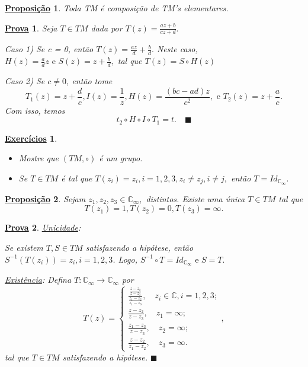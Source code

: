 \documentclass{article}
\newtheorem*{proof*}{\underline{Prova}}
\newtheorem*{prop*}{\underline{Proposi\c c\~ao}}
\newtheorem*{exer*}{\underline{Exerc\'icios}}
\renewcommand\qedsymbol{$\blacksquare$}
\begin{document}
 \begin{prop*}
   Toda TM \'e composi\c c\~ao de TM's elementares.
 \end{prop*}
 \begin{proof*}
   Seja $T\in{TM}$ dada por $T(z) = \frac{az + b}{cz + d}.$

   Caso 1) Se c = 0, ent\~ao $T(z) = \frac{az}{d} + \frac{b}{d}.$ Neste caso, $H(z) = \frac{a}{d}z \text{ e } S(z) = z + \frac{b}{d},$
   tal que $T(z) = S\circ{H(z)}$

  Caso 2) Se $c\neq0$, ent\~ao tome 
  $$
   T_1(z) = z + \frac{d}{c}, I(z) = \frac{1}{z}, H(z) = \frac{(bc - ad)z}{c^2}, \text{ e } T_2(z) = z + \frac{a}{c}.
  $$
Com isso, temos 
  $$
  t_2\circ{H}\circ{I}\circ{T_1} = t. \quad \text{\qedsymbol}
  $$
 \end{proof*}
\begin{exer*}
 \begin{itemize}
   \item[1)]Mostre que $(TM, \circ)$ \'e um grupo.
   \item[2)] Se $T\in{TM}$ \'e tal que $T(z_{i}) = z_{i}, i = 1, 2, 3, z_{i}\neq z_{j}, i\neq{j},$ ent\~ao $T = Id_{\mathbb{C}_{\infty}}.$
 \end{itemize}
\end{exer*}
 \begin{prop*}
   Sejam $z_1, z_2, z_3\in \mathbb{C}_{\infty}, $ distintos. Existe uma \'unica $T\in{TM}$ tal que
   $$
    T(z_1) = 1, T(z_2) = 0, T(z_3) = \infty.
   $$
 \end{prop*}
\begin{proof*}
  \underline{Unicidade}: 

  Se existem $T, S\in{TM}$ satisfazendo a hip\'otese, ent\~ao $S^{-1}(T(z_i)) = z_{i}, i=1, 2, 3$. Logo, 
  $S^{-1}\circ{T} = Id_{\mathbb{C}_{\infty}} \text{ e } S = T.$

  \underline{Exist\^encia}: Defina $T:\mathbb{C}_{\infty}\rightarrow \mathbb{C}_{\infty}$ por 
  $$
  T(z) = \left\{\begin{array}{ll}
      \frac{\frac{z-z_2}{z-z_3}}{\frac{z_1-z_2}{z_1-z_3}}, \quad z_{i}\in \mathbb{C}, i=1, 2, 3; \\
      \frac{z-z_2}{z-z_3}, \quad z_1 = \infty; \\
      \frac{z_1 - z_3}{z - z_3}, \quad z_2 = \infty; \\
      \frac{z - z_2}{z_1 - z_2}, \quad z_3 = \infty.
    \end{array}\right.,
  $$
  tal que $T\in{TM}$ satisfazendo a hip\'otese. \qedsymbol
\end{proof*}
\end{document}
